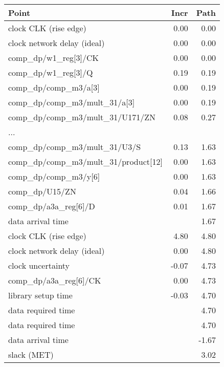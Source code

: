 \begin{tabular}[t]{|lrr|}\hline
\textbf{Point}                                      &             \textbf{Incr }   &   \textbf{Path}\\\hline
  clock CLK (rise edge)                                 &  0.00    &   0.00\\
  clock network delay (ideal)                          &   0.00     &  0.00\\
  comp\_dp/w1\_reg[3]/CK                         &  0.00    &   0.00 \\
  comp\_dp/w1\_reg[3]/Q                         &  0.19    &   0.19 \\
  comp\_dp/comp\_m3/a{[3]}   				& 0.00     &  0.19 \\
  comp\_dp/comp\_m3/mult\_31/a{[3]}                          &  0.00    &   0.19 \\
  comp\_dp/comp\_m3/mult\_31/U171/ZN               & 0.08    &   0.27 \\
  ...& &\\
  comp\_dp/comp\_m3/mult\_31/U3/S                     &0.13    &   1.63 \\
  comp\_dp/comp\_m3/mult\_31/product{[12]}       &0.00 &      1.63 \\
  comp\_dp/comp\_m3/y{[6]}  &0.00     &  1.63 \\
  comp\_dp/U15/ZN                              &  0.04    &   1.66 \\
  comp\_dp/a3a\_reg[6]/D                          & 0.01    &   1.67 \\
  data arrival time                                      & &            1.67\\
\hline
  clock CLK (rise edge)                                &   4.80   &    4.80\\
  clock network delay (ideal)                          &   0.00   &    4.80\\
  clock uncertainty                                    &  -0.07   &    4.73\\
  comp\_dp/a3a\_reg{[6]}/CK                       &   0.00  &    4.73 \\
  library setup time                                   &  -0.03  &     4.70\\
  data required time                                   &          &    4.70\\
  \hline
  data required time                                    &         &    4.70\\
  data arrival time                                       &        &  -1.67\\
  \hline
  slack (MET)                                             &        &   3.02\\\hline
\end{tabular}
